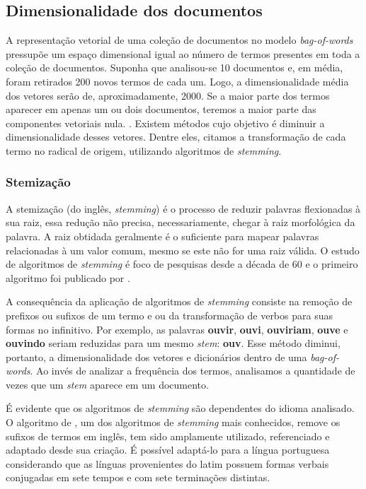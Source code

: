 \subsection{Dimensionalidade dos documentos}
\label{sub:dimensionalidade_dos_documentos}

A representação vetorial de uma coleção de documentos no modelo \textit{bag-of-words} pressupõe um espaço dimensional igual ao número de termos presentes em toda a coleção de documentos. Suponha que analisou-se 10 documentos e, em média, foram retirados 200 novos termos de cada um. Logo, a dimensionalidade média dos vetores serão de, aproximadamente, 2000. Se a maior parte dos termos aparecer em apenas um ou dois documentos, teremos a maior parte das componentes vetoriais nula. \cite{pretext}. Existem métodos cujo objetivo é diminuir a dimensionalidade desses vetores. Dentre eles, citamos a transformação de cada termo no radical de origem, utilizando algoritmos de \textit{stemming}.

\subsubsection{Stemização}
\label{ssub:stemização}

A stemização (do inglês, \textit{stemming}) é o processo de reduzir palavras flexionadas à sua raiz, essa redução não precisa, necessariamente, chegar à raiz morfológica da palavra. A raiz obtidada geralmente é o suficiente para mapear palavras relacionadas à um valor comum, mesmo se este não for uma raiz válida. O estudo de algoritmos de \textit{stemming} é foco de pesquisas desde a década de 60 e o primeiro algoritmo foi publicado por .

A consequência da aplicação de algoritmos de \textit{stemming} consiste na remoção de prefixos ou sufixos de um termo e ou da transformação de verbos para suas formas no infinitivo. Por exemplo, as palavras \textbf{ouvir}, \textbf{ouvi}, \textbf{ouviriam}, \textbf{ouve} e \textbf{ouvindo} seriam reduzidas para um mesmo \textit{stem}: \textbf{ouv}. Esse método diminui, portanto, a dimensionalidade dos vetores e dicionários dentro de uma \textit{bag-of-words}. Ao invés de analizar a frequência dos termos, analisamos a quantidade de vezes que um \textit{stem} aparece em um documento.

É evidente que os algoritmos de \textit{stemming} são dependentes do idioma analisado. O algoritmo de , um dos algoritmos de \textit{stemming} mais conhecidos, remove os sufixos de termos em inglês, tem sido amplamente utilizado, referenciado e adaptado desde sua criação. É possível adaptá-lo para a língua portuguesa considerando que as línguas provenientes do latim possuem formas verbais conjugadas em sete tempos e com sete terminações distintas.

